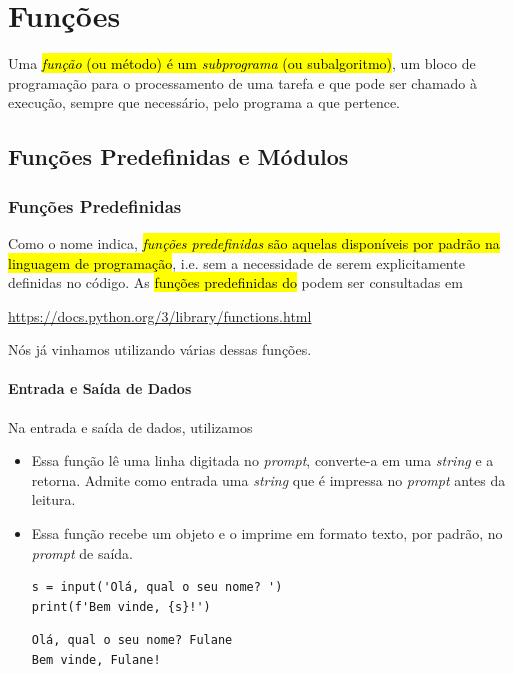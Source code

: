 \chapter{Funções}\label{cap_fun}

Uma \hl{\emph{função} (ou método) é um \emph{subprograma} (ou subalgoritmo)}, um bloco de programação para o processamento de uma tarefa e que pode ser chamado à execução, sempre que necessário, pelo programa a que pertence.

\section{Funções Predefinidas e Módulos}\label{cap_fun_sec_buildin}

\subsection{Funções Predefinidas}

Como o nome indica, \hl{\emph{funções predefinidas} são aquelas disponíveis por padrão na linguagem de programação}, i.e. sem a necessidade de serem explicitamente definidas no código. As \hl{funções predefinidas do {\python}} podem ser consultadas em
\begin{center}
  \url{https://docs.python.org/3/library/functions.html}
\end{center}

Nós já vinhamos utilizando várias dessas funções.

\subsubsection{Entrada e Saída de Dados}

Na entrada e saída de dados, utilizamos
\begin{itemize}
\item {\PYTHONinput} 

  Essa função lê uma linha digitada no \textit{prompt}, converte-a em uma \textit{string} e a retorna. Admite como entrada uma \textit{string} que é impressa no \textit{prompt} antes da leitura.

\item {\PYTHONprint} 

  Essa função recebe um objeto e o imprime em formato texto, por padrão, no \textit{prompt} de saída.

\begin{lstlisting}[xrightmargin=2.5em]
s = input('Olá, qual o seu nome? ')
print(f'Bem vinde, {s}!')
\end{lstlisting}

\begin{verbatim}
Olá, qual o seu nome? Fulane
Bem vinde, Fulane!
\end{verbatim}

\end{itemize}


